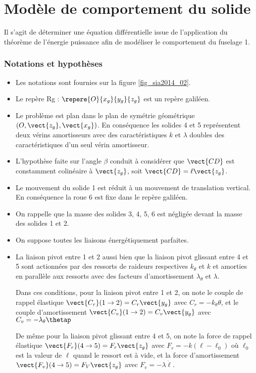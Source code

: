 \section{Modèle de comportement du solide}
\begin{obj}
Il s'agit de déterminer une équation différentielle issue de l'application du théorème de l'énergie puissance 
 afin de modéliser le comportement du fuselage 1.
\end{obj}

\subsubsection*{Notations et hypothèses}
\begin{itemize}
\item Les notations sont fournies sur la figure \ref{fig_sia2014_02}. 
\item Le repère Rg : $\repere{O}{x_g}{y_g}{z_g}$ est un repère galiléen. 
\item Le problème est plan dans le plan de symétrie géométrique $\left(O,\vect{z_g},\vect{x_g}\right)$. En conséquence les solides 4 et 5
représentent deux vérins amortisseurs avec des caractéristiques $k$ et $\lambda$ doubles des caractéristiques d'un seul 
vérin amortisseur. 

\item L'hypothèse faite sur l'angle $\beta$ conduit à considérer que $\vect{CD}$ est constamment colinéaire à $\vect{z_g}$, soit 
$\vect{CD} = \ell \vect{z_g}$. 

\item Le mouvement du solide 1 est réduit à un mouvement de translation vertical. En conséquence la roue 6 est 
fixe dans le repère galiléen. 

\item On rappelle que la masse des solides 3, 4, 5, 6 est négligée devant la masse des solides 1 et 2. 

\item On suppose toutes les liaisons énergétiquement parfaites. 

\item La liaison pivot entre 1 et 2 aussi bien que la liaison pivot glissant entre 4 et 5 sont actionnées par des ressorts 
de raideurs respectives $k_{\theta}$ et $k$ et amorties en parallèle aux ressorts avec des facteurs d'amortissement $\lambda_{\theta}$ et $\lambda$. 

Dans ces conditions, pour la liaison pivot entre 1 et 2, on note le couple de rappel élastique $\vect{C_r}(1\rightarrow 2) = C_r \vect{y_g}$ avec $C_r =-k_{\theta} \theta$, et le couple d'amortissement $\vect{C_v}(1\rightarrow 2) = C_v \vect{y_g}$ avec $C_v= -\lambda_{\theta} \thetap$

De même pour la liaison pivot glissant entre 4 et 5, on note la force de rappel élastique $\vect{F_r}(4\rightarrow 5) = F_r \vect{z_g}$ avec 
$F_r = -k \left( \ell - \ell_0\right)$ où $\ell_0$ est la valeur de $\ell$ quand le ressort est à vide, et la force d'amortissement $\vect{F_v}(4\rightarrow 5) = F_V \vect{z_g}$ avec $F_v = -\lambda\dot{\ell}$.

\end{itemize}

